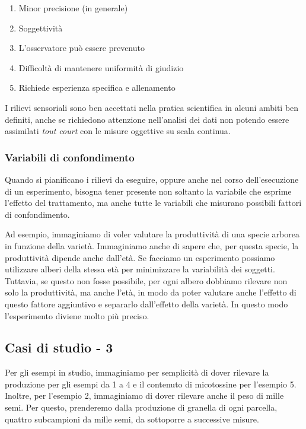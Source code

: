 \documentclass[a4paper,12pt,oneside]{book}
\providecommand{\tightlist}{%
  \setlength{\itemsep}{0pt}\setlength{\parskip}{0pt}}
\begin{document}
\begin{enumerate}
\def\labelenumi{\arabic{enumi}.}
\tightlist
\item
  Minor precisione (in generale)
\item
  Soggettività
\item
  L'osservatore può essere prevenuto
\item
  Difficoltà di mantenere uniformità di giudizio
\item
  Richiede esperienza specifica e allenamento
\end{enumerate}

I rilievi sensoriali sono ben accettati nella pratica scientifica in
alcuni ambiti ben definiti, anche se richiedono attenzione nell'analisi
dei dati non potendo essere assimilati \emph{tout court} con le misure
oggettive su scala continua.

\subsubsection{Variabili di
confondimento}\label{variabili-di-confondimento}

Quando si pianificano i rilievi da eseguire, oppure anche nel corso
dell'esecuzione di un esperimento, bisogna tener presente non soltanto
la variabile che esprime l'effetto del trattamento, ma anche tutte le
variabili che misurano possibili fattori di confondimento.

Ad esempio, immaginiamo di voler valutare la produttività di una specie
arborea in funzione della varietà. Immaginiamo anche di sapere che, per
questa specie, la produttività dipende anche dall'età. Se facciamo un
esperimento possiamo utilizzare alberi della stessa età per minimizzare
la variabilità dei soggetti. Tuttavia, se questo non fosse possibile,
per ogni albero dobbiamo rilevare non solo la produttività, ma anche
l'età, in modo da poter valutare anche l'effetto di questo fattore
aggiuntivo e separarlo dall'effetto della varietà. In questo modo
l'esperimento diviene molto più preciso.

\subsection{Casi di studio - 3}\label{casi-di-studio---3}

Per gli esempi in studio, immaginiamo per semplicità di dover rilevare
la produzione per gli esempi da 1 a 4 e il contenuto di micotossine per
l'esempio 5. Inoltre, per l'esempio 2, immaginiamo di dover rilevare
anche il peso di mille semi. Per questo, prenderemo dalla produzione di
granella di ogni parcella, quattro subcampioni da mille semi, da
sottoporre a successive misure.
\end{document}
